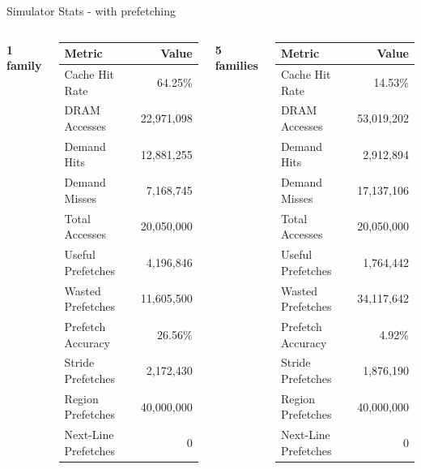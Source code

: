 \documentclass[Serif, 10pt, brown]{beamer}
\theoremstyle{example}
\theoremstyle{plain}
\begin{document}
\begin{frame}{Simulator Stats - with prefetching}
\begin{columns}
    \centering
    \textbf{1 family}
    
    \vspace{2mm}
    
    {\scriptsize \begin{tabular}{|l|r|}
        \hline
        Metric & Value \\
        \hline
        Cache Hit Rate & 64.25\% \\
        DRAM Accesses & 22,971,098 \\
        Demand Hits & 12,881,255 \\
        Demand Misses & 7,168,745 \\
        Total Accesses & 20,050,000 \\
        Useful Prefetches & 4,196,846 \\
        Wasted Prefetches & 11,605,500 \\
        Prefetch Accuracy & 26.56\% \\
        Stride Prefetches & 2,172,430 \\
        Region Prefetches & 40,000,000 \\
        Next-Line Prefetches & 0 \\
        \hline
    \end{tabular}}

    \centering
    \textbf{5 families}
    
    \vspace{2mm}
    
    {\scriptsize \begin{tabular}{|l|r|}
        \hline
        Metric & Value \\
        \hline
        Cache Hit Rate & 14.53\% \\
        DRAM Accesses & 53,019,202 \\
        Demand Hits & 2,912,894 \\
        Demand Misses & 17,137,106 \\
        Total Accesses & 20,050,000 \\
        Useful Prefetches & 1,764,442 \\
        Wasted Prefetches & 34,117,642 \\
        Prefetch Accuracy & 4.92\% \\
        Stride Prefetches & 1,876,190 \\
        Region Prefetches & 40,000,000 \\
        Next-Line Prefetches & 0 \\
        \hline
    \end{tabular}}

\end{columns}

\vspace{3mm}

\centering
\small
\end{frame}
\end{document}
